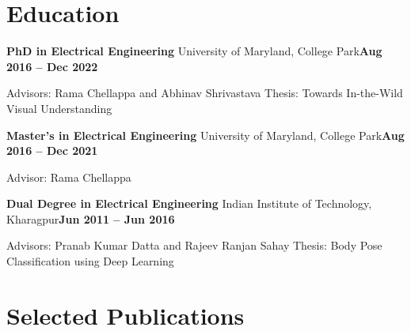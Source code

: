 \documentclass[10pt, letterpaper]{article}
\newcommand{\datepill}[1]{{\setlength{\fboxsep}{2pt}\colorbox{accent!10}{\small\color{accent}\bfseries #1}}}
\newcommand{\degree}[4]{\textbf{#1} \textperiodcentered{} #2\hfill\datepill{#3}\par{\leftskip=0.5cm\color{muted}\small #4\par}\vspace{0.15cm}}
\begin{document}
\section{Education}
\degree{PhD in Electrical Engineering}{University of Maryland, College Park}{Aug 2016 -- Dec 2022}{Advisors: Rama Chellappa and Abhinav Shrivastava \textperiodcentered{} Thesis: Towards In-the-Wild Visual Understanding}
\degree{Master's in Electrical Engineering}{University of Maryland, College Park}{Aug 2016 -- Dec 2021}{Advisor: Rama Chellappa}
\degree{Dual Degree in Electrical Engineering}{Indian Institute of Technology, Kharagpur}{Jun 2011 -- Jun 2016}{Advisors: Pranab Kumar Datta and Rajeev Ranjan Sahay \textperiodcentered{} Thesis: Body Pose Classification using Deep Learning}
\section{Selected Publications}
\end{document}

